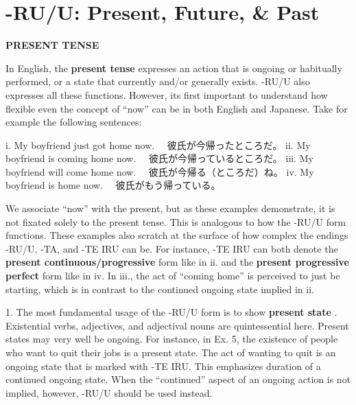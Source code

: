 \section{-RU\slash U: Present, Future, \& Past}
 
\begin{center}
\textbf{PRESENT TENSE }
\end{center}

\par{ In English, the \textbf{present tense }expresses an action that is ongoing or habitually performed, or a state that currently and\slash or generally exists. -RU\slash U also expresses all these functions. However, it\textquotesingle s first important to understand how flexible even the concept of “now” can be in both English and Japanese. Take for example the following sentences: }

\par{i. My boyfriend just got home now. \textrightarrow 　彼氏が今帰ったところだ。 \hfill\break
ii. My boyfriend is coming home now. \textrightarrow 　彼氏が今帰っているところだ。 \hfill\break
iii. My boyfriend will come home now. \textrightarrow 　彼氏が今帰る（ところだ）ね。 \hfill\break
iv. My boyfriend is home now. \textrightarrow 　彼氏がもう帰っている。 }

\par{ We associate “now” with the present, but as these examples demonstrate, it is not fixated solely to the present tense. This is analogous to how the -RU\slash U form functions. These examples also scratch at the surface of how complex the endings -RU\slash U, -TA, and -TE IRU can be. For instance, -TE IRU can both denote the \textbf{present continuous\slash progressive }form like in ii. and the \textbf{present progressive perfect }form like in iv. In iii., the act of “coming home” is perceived to just be starting, which is in contrast to the continued ongoing state implied in ii. }

\par{1. The most fundamental usage of the -RU\slash U form is to show \textbf{present state }. Existential verbs, adjectives, and adjectival nouns are quintessential here. Present states may very well be ongoing. For instance, in Ex. 5, the existence of people who want to quit their jobs is a present state. The act of wanting to quit is an ongoing state that is marked with -TE IRU. This emphasizes duration of a continued ongoing state. When the “continued” aspect of an ongoing action is not implied, however, -RU\slash U should be used instead. }

